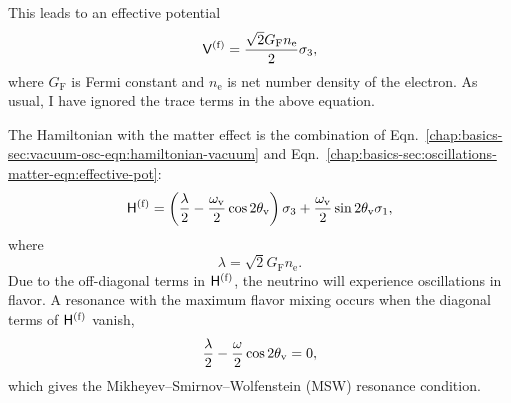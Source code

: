 This leads to an effective potential
\begin{equation}
\mathsf V^{(\ff)} = \frac{\sqrt{2}G_{\mathrm F} n_{\mathrm e} }{2}  \sigma_3,
\label{chap:basics-sec:oscillations-matter-eqn:effective-pot}
\end{equation}
where $G_{\mathrm F}$ is Fermi constant and $n_{\mathrm e}$ is net number density of the electron. As usual, I have ignored the trace terms in the above equation.

The Hamiltonian with the matter effect is the combination of Eqn.~\ref{chap:basics-sec:vacuum-osc-eqn:hamiltonian-vacuum} and Eqn.~\ref{chap:basics-sec:oscillations-matter-eqn:effective-pot}:
\begin{equation}
\mathsf H^{(\ff)} = \left(\frac{\lambda}{2} -\frac{ \omega_\vv }{2} \cos 2\theta_\vv \right) {\sigma}_3  + \frac{ \omega_\vv }{2} \sin 2\theta_\vv {\sigma}_1,
\label{chap:basics-sec:msw-eqn:hamiltonian-matter-effect}
\end{equation}
where
\begin{equation}
  \lambda = \sqrt{2}G_{\mathrm F} n_{\mathrm e}.
  \label{chap:basics-sec:oscillations-matter-eqn:lambda}
\end{equation}
Due to the off-diagonal terms in $\mathsf H^{(\mathrm f)}$, the neutrino will experience oscillations in flavor. A resonance with the maximum flavor mixing occurs when the diagonal terms of $\mathsf H^{(\mathrm f)}$ vanish,
\begin{equation}
\frac{\lambda}{2} -\frac{ \omega }{2} \cos 2\theta_\vv  = 0,
\label{chap:basics-eqn:msw-resonance}
\end{equation}
which gives the Mikheyev--Smirnov--Wolfenstein (MSW) resonance condition.


